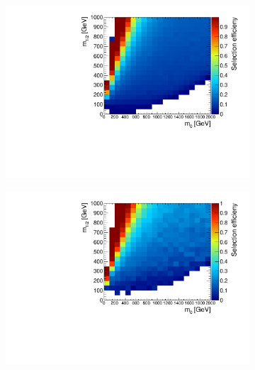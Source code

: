 \begin{figure}[ht!]
  \centering
  \begin{subfigure}[b]{0.495\textwidth}
    \centering
    \includegraphics[width=\textwidth]{plots/hX01Ratio.pdf}
    \caption{\label{fig:x01}}
  \end{subfigure}
  \begin{subfigure}[b]{0.495\textwidth}
    \centering
    \includegraphics[width=\textwidth]{plots/hCutX01Ratio.pdf}
    \caption{\label{fig:cutx01}}
  \end{subfigure}


\end{figure}

